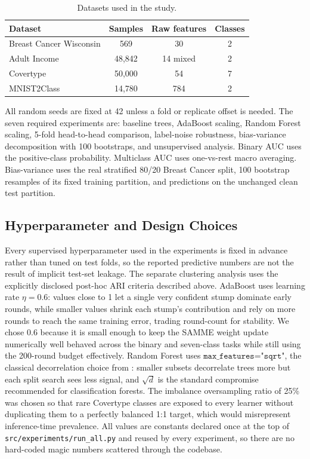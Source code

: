 \documentclass[conference]{IEEEtran}
\begin{document}
\begin{table}[t]
\centering
\caption{Datasets used in the study.}
\label{tab:datasets}
\begin{tabular}{lccc}
\toprule
Dataset & Samples & Raw features & Classes \\
\midrule
Breast Cancer Wisconsin & 569 & 30 & 2 \\
Adult Income & 48,842 & 14 mixed & 2 \\
Covertype & 50,000 & 54 & 7 \\
MNIST2Class & 14,780 & 784 & 2 \\
\bottomrule
\end{tabular}
\end{table}

All random seeds are fixed at 42 unless a fold or replicate offset is needed.
The seven required experiments are: baseline trees, AdaBoost scaling,
Random Forest scaling, 5-fold head-to-head comparison, label-noise
robustness, bias-variance decomposition with 100 bootstraps, and
unsupervised analysis. Binary AUC uses the positive-class probability.
Multiclass AUC uses one-vs-rest macro averaging. Bias-variance uses the real
stratified 80/20 Breast Cancer split, 100 bootstrap resamples of its fixed
training partition, and predictions on the unchanged clean test partition.

\subsection{Hyperparameter and Design Choices}
Every supervised hyperparameter used in the experiments is fixed in advance
rather than tuned on test folds, so the reported predictive numbers are not
the result of implicit test-set leakage. The separate clustering analysis uses
the explicitly disclosed post-hoc ARI criteria described above. AdaBoost uses
learning rate $\eta=0.6$: values
close to 1 let a single very confident stump dominate early rounds, while
smaller values shrink each stump's contribution and rely on more rounds to
reach the same training error, trading round-count for stability. We chose
$0.6$ because it is small enough to keep the SAMME weight update numerically
well behaved across the binary and seven-class tasks while still using the
200-round budget effectively.
Random Forest uses $\texttt{max\_features="sqrt"}$, the classical
decorrelation choice from \cite{breiman2001random}: smaller subsets
decorrelate trees more but each split search sees less signal, and $\sqrt{d}$
is the standard compromise recommended for classification forests. The
imbalance oversampling ratio of 25\% was chosen so that rare Covertype classes
are exposed to every learner without duplicating them to a perfectly balanced
1:1 target, which would misrepresent inference-time prevalence. All values are
constants declared once at the top of \texttt{src/experiments/run\_all.py}
and reused by every experiment, so there are no hard-coded magic numbers
scattered through the codebase.
\end{document}
